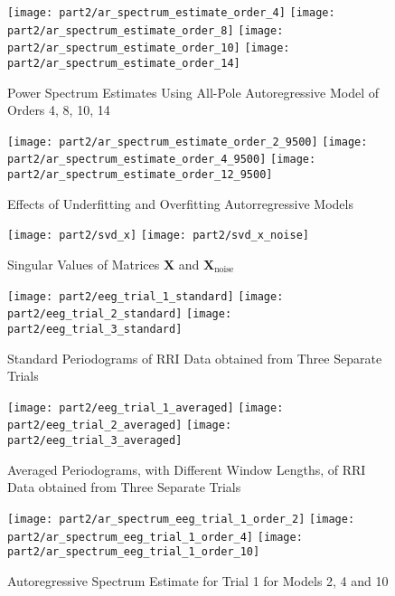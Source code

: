 \begin{figure}[H]
\centering{}
\texttt{[image: part2/ar\_spectrum\_estimate\_order\_4]}
\texttt{[image: part2/ar\_spectrum\_estimate\_order\_8]}
\texttt{[image: part2/ar\_spectrum\_estimate\_order\_10]}
\texttt{[image: part2/ar\_spectrum\_estimate\_order\_14]}
\caption{Power Spectrum Estimates Using All-Pole Autoregressive Model of Orders 4, 8, 10, 14}
\end{figure}

\begin{figure}[H]
\centering{}
\texttt{[image: part2/ar\_spectrum\_estimate\_order\_2\_9500]}
\texttt{[image: part2/ar\_spectrum\_estimate\_order\_4\_9500]}
\texttt{[image: part2/ar\_spectrum\_estimate\_order\_12\_9500]}
\caption{Effects of Underfitting and Overfitting Autorregressive Models}
\end{figure}

\begin{figure}[H]
\centering{}
\texttt{[image: part2/svd\_x]}
\texttt{[image: part2/svd\_x\_noise]}
\caption{Singular Values of Matrices $\textbf{X}$ and $\textbf{X}_{\text{noise}}$}
\end{figure}

\begin{figure}[H]
\centering{}
\texttt{[image: part2/eeg\_trial\_1\_standard]}
\texttt{[image: part2/eeg\_trial\_2\_standard]}
\texttt{[image: part2/eeg\_trial\_3\_standard]}
\caption{Standard Periodograms of RRI Data obtained from Three Separate Trials}
\end{figure}

\begin{figure}[H]
\centering{}
\texttt{[image: part2/eeg\_trial\_1\_averaged]}
\texttt{[image: part2/eeg\_trial\_2\_averaged]}
\texttt{[image: part2/eeg\_trial\_3\_averaged]}
\caption{Averaged Periodograms, with Different Window Lengths, of RRI Data obtained from Three Separate Trials}
\end{figure}


\begin{figure}[H]
\centering{}
\texttt{[image: part2/ar\_spectrum\_eeg\_trial\_1\_order\_2]}
\texttt{[image: part2/ar\_spectrum\_eeg\_trial\_1\_order\_4]}
\texttt{[image: part2/ar\_spectrum\_eeg\_trial\_1\_order\_10]}
\caption{Autoregressive Spectrum Estimate for Trial 1 for Models 2, 4 and 10}
\end{figure}

